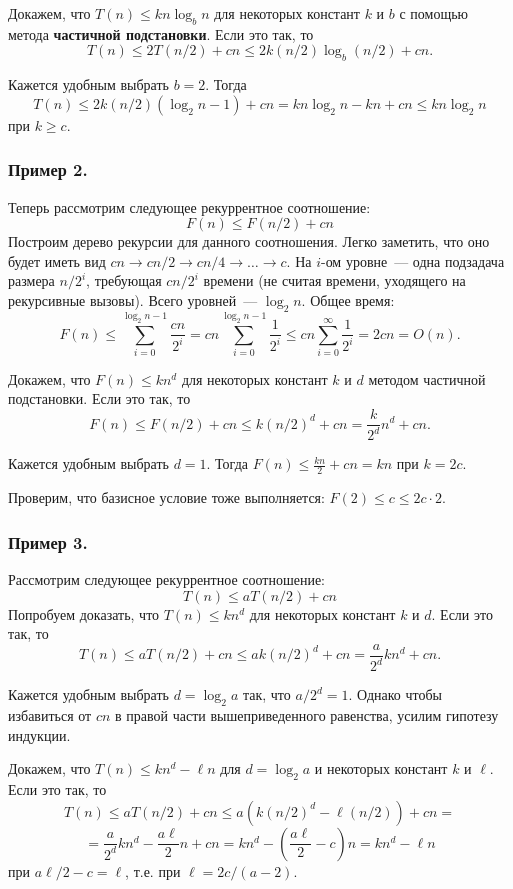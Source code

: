 \documentclass[a4paper,12pt]{article}
\begin{document}
Докажем, что $T(n) \leq kn \log_b n$ для некоторых констант $k$ и $b$ с помощью метода \textbf{частичной подстановки}. Если это так, то
\[T(n) \leq 2T(n/2) + cn \leq 2k(n/2)\log_b(n/2) + cn.\]

Кажется удобным выбрать $b = 2$. Тогда
\[T(n) \leq 2k(n/2)(\log_2n - 1) + cn = kn\log_2n - kn + cn \leq kn\log_2 n\]
при $k \geq c$.

\subsubsection{Пример 2.}

Теперь рассмотрим следующее рекуррентное соотношение: \[F(n) \leqslant F(n/2) + cn\]
Построим дерево рекурсии для данного соотношения. Легко заметить, что оно будет иметь вид $cn \to cn/2 \to cn/4 \to \ldots \to c$. На $i$-ом уровне~--- одна подзадача размера $n / 2^i$, требующая $cn / 2^i$ времени (не считая времени, уходящего на рекурсивные вызовы). Всего уровней~--- $\log_2 n$. Общее время:
\[F(n) \leq \sum_{i=0}^{\log_2n - 1}\frac{cn}{2^i} = cn\sum_{i=0}^{\log_2n - 1}\frac{1}{2^i} \leq cn \sum_{i=0}^{\infty}\frac{1}{2^i} = 2cn = O(n).\]

Докажем, что $F(n) \leq kn^d$ для некоторых констант $k$ и $d$ методом частичной подстановки. Если это так, то
\[F(n) \leq F(n/2) + cn \leq k(n/2)^d + cn = \frac{k}{2^d}n^d + cn.\]

Кажется удобным выбрать $d = 1$. Тогда $F(n) \leq \frac{kn}{2} + cn = kn$ при $k = 2c$.

Проверим, что базисное условие тоже выполняется: $F(2) \leq c \leq 2c \cdot 2$.

\subsubsection{Пример 3.}
Рассмотрим следующее рекуррентное соотношение:
\[T(n) \leq aT(n/2) + cn\]
Попробуем доказать, что $T(n) \leq kn^d$ для некоторых констант $k$ и $d$. Если это так, то
\[T(n) \leq aT(n/2) + cn \leq ak(n/2)^d + cn = \frac{a}{2^d}kn^d + cn.\]

Кажется удобным выбрать $d = \log_2 a$ так, что $a / 2^d = 1$. Однако чтобы избавиться от $cn$ в правой части вышеприведенного равенства, усилим гипотезу индукции.

Докажем, что $T(n) \leq kn^d - \ell n$ для $d = \log_2a$ и некоторых констант $k$ и $\ell$. Если это так, то
\[T(n) \leq aT(n/2) + cn \leq a(k(n/2)^d - \ell(n/2)) + cn =\]
\[= \frac{a}{2^d}kn^d - \frac{a\ell}{2}n + cn = kn^d - (\frac{a\ell}{2} - c)n = kn^d - \ell n\]
при $a\ell/2 - c = \ell$, т.е. при $\ell = 2c / (a - 2)$.
\end{document}
